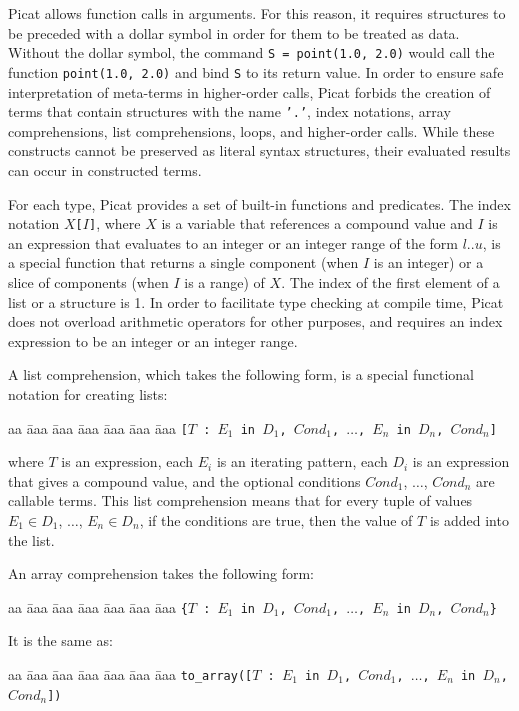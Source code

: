 Picat allows function calls in arguments. For this reason, it requires structures to be preceded with a dollar symbol in order for them to be treated as data. Without the dollar symbol, the command \texttt{S = point(1.0, 2.0)} would call the function \texttt{point(1.0, 2.0)} and bind \texttt{S} to its return value. In order to ensure safe interpretation of meta-terms in higher-order calls, Picat forbids the creation of terms that contain structures with the name \texttt{'.'}, index notations, array comprehensions, list comprehensions, loops, and higher-order calls. While these constructs cannot be preserved as literal syntax structures, their evaluated results can occur in constructed terms.

For each type, Picat provides a set of built-in functions and predicates. The index notation \texttt{$X$[$I$]}, where $X$ is a variable that references a compound value and $I$ is an expression that evaluates to an integer or an integer range of the form $l..u$, is a special function that returns a single component (when $I$ is an integer) or a slice of components (when $I$ is a range) of $X$. The index of the first element of a list or a structure is 1. In order to facilitate type checking at compile time, Picat does not overload arithmetic operators for other purposes, and requires an index expression to be an integer or an integer range.

A list comprehension, which takes the following form, is a special functional notation for creating lists:
\begin{tabbing}
aa \= aaa \= aaa \= aaa \= aaa \= aaa \= aaa \kill
\> \> \texttt{[$T$ : $E_1$ \texttt{in} $D_1$, $Cond_1$, $\ldots$, $E_n$ in $D_n$, $Cond_n$]} 
\end{tabbing}
where $T$ is an expression, each $E_i$ is an iterating pattern, each $D_i$ is an expression that gives a compound value, and the optional conditions $Cond_1$, $\ldots$, $Cond_n$  are callable terms. This list comprehension means that for every tuple of values $E_1 \in D_1$, $\ldots$, $E_n \in D_n$, if the conditions are true, then the value of $T$ is added into the list.

An array comprehension takes the following form:
\begin{tabbing}
aa \= aaa \= aaa \= aaa \= aaa \= aaa \= aaa \kill
\> \> \texttt{\{$T$ : $E_1$ \texttt{in} $D_1$, $Cond_1$, $\ldots$, $E_n$ in $D_n$, $Cond_n$\}} 
\end{tabbing}
It is the same as:
\begin{tabbing}
aa \= aaa \= aaa \= aaa \= aaa \= aaa \= aaa \kill
\> \> \texttt{to\_array([$T$ : $E_1$ \texttt{in} $D_1$, $Cond_1$, $\ldots$, $E_n$ in $D_n$, $Cond_n$])} 
\end{tabbing}

